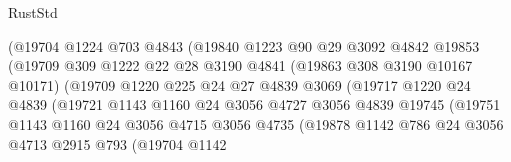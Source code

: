 \begin{lexlean}{RustStd}
\begin{coremodule}
                              (@19704
                                @1224
                                @703
                                @4843
                                (@19840
                                  @1223
                                  @90
                                  @29
                                  @3092
                                  @4842
                                  @19853
                                  (@19709
                                    @309
                                    @1222
                                    @22
                                    @28
                                    @3190
                                    @4841
                                    (@19863 @308 @3190 @10167 @10171)
                                    (@19709
                                      @1220
                                      @225
                                      @24
                                      @27
                                      @4839
                                      @3069
                                      (@19717
                                        @1220
                                        @24
                                        @4839
                                        (@19721
                                          @1143
                                          @1160
                                          @24
                                          @3056
                                          @4727
                                          @3056
                                          @4839
                                          @19745
                                          (@19751
                                            @1143
                                            @1160
                                            @24
                                            @3056
                                            @4715
                                            @3056
                                            @4735
                                            (@19878
                                              @1142
                                              @786
                                              @24
                                              @3056
                                              @4713
                                              @2915
                                              @793
                                              (@19704
                                                @1142

\end{coremodule}
\end{lexlean}
